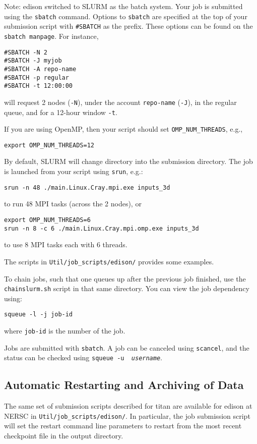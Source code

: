 Note: edison switched to SLURM as the batch system.  Your job is submitted
using the {\tt sbatch} command.  Options to {\tt sbatch} are specified at the
top of your submission script with {\tt \#SBATCH} as the prefix.  These options
can be found on the {\tt sbatch manpage}.  For instance, 
\begin{verbatim}
#SBATCH -N 2
#SBATCH -J myjob
#SBATCH -A repo-name
#SBATCH -p regular
#SBATCH -t 12:00:00
\end{verbatim}
will request 2 nodes ({\tt -N}), under the account {\tt repo-name} ({\tt -J}),
in the regular queue, and for a 12-hour window {\tt -t}.

If you are using OpenMP, then your script should set {\tt OMP\_NUM\_THREADS}, e.g.,
\begin{verbatim}
export OMP_NUM_THREADS=12
\end{verbatim}

By default, SLURM will change directory into the submission directory.  The 
job is launched from your script using {\tt srun}, e.g.:
\begin{verbatim}
srun -n 48 ./main.Linux.Cray.mpi.exe inputs_3d
\end{verbatim}
to run 48 MPI tasks (across the 2 nodes), or 
\begin{verbatim}
export OMP_NUM_THREADS=6
srun -n 8 -c 6 ./main.Linux.Cray.mpi.omp.exe inputs_3d
\end{verbatim}
to use 8 MPI tasks each with 6 threads.

The scripts in {\tt Util/job\_scripts/edison/} provides some examples.

To chain jobs, such that one queues up after the previous job finished,
use the {\tt chainslurm.sh} script in that same directory. You can view
the job dependency using:
\begin{verbatim}
squeue -l -j job-id
\end{verbatim}
where {\tt job-id} is the number of the job.

Jobs are submitted with {\tt sbatch}.  A job can be canceled using
{\tt scancel}, and the status can be checked using {\tt squeue -u {\em
username}}.

\subsection{Automatic Restarting and Archiving of Data}

The same set of submission scripts described for titan are available
for edison at NERSC in {\tt Util/job\_scripts/edison/}.  In particular,
the job submission script will set the restart command line parameters
to restart from the most recent checkpoint file in the output directory.

